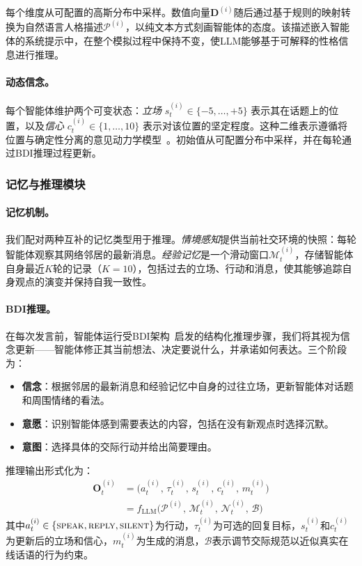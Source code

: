 每个维度从可配置的高斯分布中采样。数值向量$\mathbf{D}^{(i)}$随后通过基于规则的映射转换为自然语言人格描述$\mathcal{P}^{(i)}$，以纯文本方式刻画智能体的态度。该描述嵌入智能体的系统提示中，在整个模拟过程中保持不变，使LLM能够基于可解释的性格信息进行推理。

\paragraph{动态信念。}
每个智能体维护两个可变状态：\emph{立场} $s_t^{(i)} \in \{-5, \ldots, +5\}$ 表示其在话题上的位置，以及\emph{信心} $c_t^{(i)} \in \{1, \ldots, 10\}$ 表示对该位置的坚定程度。这种二维表示遵循将位置与确定性分离的意见动力学模型~\citep{FriedkinJohnsen1990}。初始值从可配置分布中采样，并在每轮通过BDI推理过程更新。


\subsubsection{记忆与推理模块}

\paragraph{记忆机制。}
我们配对两种互补的记忆类型用于推理。\emph{情境感知}提供当前社交环境的快照：每轮智能体观察其网络邻居的最新消息。\emph{经验记忆}是一个滑动窗口$\mathcal{M}_t^{(i)}$，存储智能体自身最近$K$轮的记录（$K{=}10$），包括过去的立场、行动和消息，使其能够追踪自身观点的演变并保持自我一致性。

\paragraph{BDI推理。}
在每次发言前，智能体运行受BDI架构~\citep{Bratman1987, Rao1995}启发的结构化推理步骤，我们将其视为信念更新——智能体修正其当前想法、决定要说什么，并承诺如何表达。三个阶段为：
\begin{itemize}
\setlength{\itemsep}{1pt}
\item \textbf{信念}：根据邻居的最新消息和经验记忆中自身的过往立场，更新智能体对话题和周围情绪的看法。
\item \textbf{意愿}：识别智能体感到需要表达的内容，包括在没有新观点时选择沉默。
\item \textbf{意图}：选择具体的交际行动并给出简要理由。
\end{itemize}
推理输出形式化为：
\begin{equation}
\begin{aligned}
  \mathbf{O}_t^{(i)} &= \bigl(a_t^{(i)},\, \tau_t^{(i)},\, s_t^{(i)},\, c_t^{(i)},\, m_t^{(i)}\bigr) \\
  &= f_{\text{LLM}}\bigl(\mathcal{P}^{(i)},\, \mathcal{M}_t^{(i)},\, \mathcal{N}_t^{(i)},\, \mathcal{B}\bigr)
\end{aligned}
\label{eq:bdi_output}
\end{equation}
其中$a_t^{(i)} \in \{\textsc{speak}, \textsc{reply}, \textsc{silent}\}$为行动，$\tau_t^{(i)}$为可选的回复目标，$s_t^{(i)}$和$c_t^{(i)}$为更新后的立场和信心，$m_t^{(i)}$为生成的消息，$\mathcal{B}$表示调节交际规范以近似真实在线话语的行为约束。


